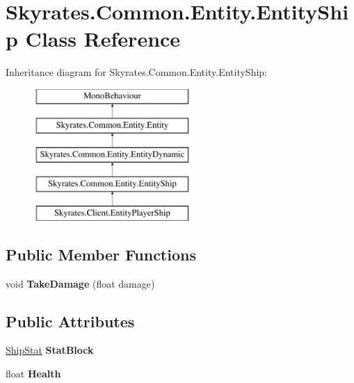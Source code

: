 \hypertarget{class_skyrates_1_1_common_1_1_entity_1_1_entity_ship}{\section{Skyrates.\-Common.\-Entity.\-Entity\-Ship Class Reference}
\label{class_skyrates_1_1_common_1_1_entity_1_1_entity_ship}
}
Inheritance diagram for Skyrates.\-Common.\-Entity.\-Entity\-Ship\-:\begin{figure}[H]
\begin{center}
\leavevmode
\includegraphics[height=5.000000cm]{class_skyrates_1_1_common_1_1_entity_1_1_entity_ship}
\end{center}
\end{figure}
\subsection*{Public Member Functions}
\begin{DoxyCompactItemize}
\item 
\hypertarget{class_skyrates_1_1_common_1_1_entity_1_1_entity_ship_af5534096f797df98b66b2d83e68cc7f4}{void {\bfseries Take\-Damage} (float damage)}\label{class_skyrates_1_1_common_1_1_entity_1_1_entity_ship_af5534096f797df98b66b2d83e68cc7f4}

\end{DoxyCompactItemize}
\subsection*{Public Attributes}
\begin{DoxyCompactItemize}
\item 
\hypertarget{class_skyrates_1_1_common_1_1_entity_1_1_entity_ship_a11f35fb2c23a46c0c2d4980b1fa3380c}{\hyperlink{class_ship_stat}{Ship\-Stat} {\bfseries Stat\-Block}}\label{class_skyrates_1_1_common_1_1_entity_1_1_entity_ship_a11f35fb2c23a46c0c2d4980b1fa3380c}

\item 
\hypertarget{class_skyrates_1_1_common_1_1_entity_1_1_entity_ship_af4bb39bce0cf06de062a3676699c5224}{float {\bfseries Health}}\label{class_skyrates_1_1_common_1_1_entity_1_1_entity_ship_af4bb39bce0cf06de062a3676699c5224}

\end{DoxyCompactItemize}
